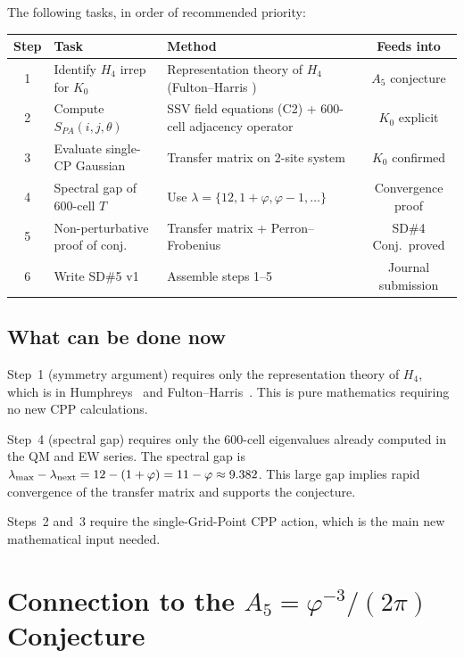 \documentclass[11pt,letterpaper]{article}
\newcommand{\phig}{\varphi}
\begin{document}
The following tasks, in order of recommended priority:

\begin{center}
\begin{tabular}{@{}clp{6cm}c@{}}
\toprule
Step & Task & Method & Feeds into \\
\midrule
1 & Identify $H_4$ irrep for $K_0$ & Representation theory of $H_4$
  (Fulton--Harris \citep{fulton1991}) & $A_5$ conjecture \\[4pt]
2 & Compute $S_{PA}(i,j,\theta)$ & SSV field equations (C2)
  + 600-cell adjacency operator & $K_0$ explicit \\[4pt]
3 & Evaluate single-CP Gaussian & Transfer matrix on 2-site
  system & $K_0$ confirmed \\[4pt]
4 & Spectral gap of 600-cell $T$ & Use $\lambda = \{12, 1+\phig,
  \phig-1, \ldots\}$ & Convergence proof \\[4pt]
5 & Non-perturbative proof of conj. & Transfer matrix + Perron--Frobenius
  & SD\#4 Conj.\ proved \\[4pt]
6 & Write SD\#5 v1 & Assemble steps 1--5 & Journal submission \\
\bottomrule
\end{tabular}
\end{center}

\subsection{What can be done now}

Step~1 (symmetry argument) requires only the representation theory
of $H_4$, which is in Humphreys~\citep{humphreys1990} and
Fulton--Harris~\citep{fulton1991}.  This is pure mathematics
requiring no new CPP calculations.

Step~4 (spectral gap) requires only the 600-cell eigenvalues
already computed in the QM and EW series.  The spectral gap is
$\lambda_{\rm max} - \lambda_{\rm next} = 12 - (1+\phig) =
11 - \phig \approx 9.382$.  This large gap implies rapid
convergence of the transfer matrix and supports the conjecture.

Steps~2 and~3 require the single-Grid-Point CPP action, which is
the main new mathematical input needed.

\section{Connection to the $A_5 = \phig^{-3}/(2\pi)$ Conjecture}
\end{document}
